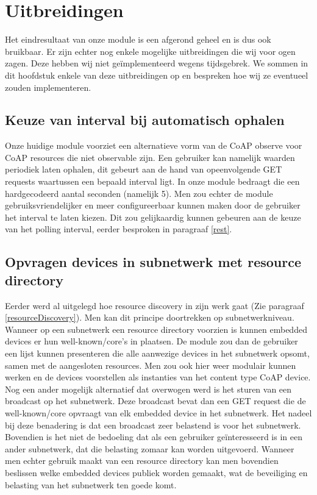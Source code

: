 \chapter{Uitbreidingen} \label{uitbreidingen}

Het eindresultaat van onze module is een afgerond geheel en is dus ook bruikbaar. Er zijn echter nog enkele mogelijke uitbreidingen die wij voor ogen zagen. Deze hebben wij niet ge\"{i}mplementeerd wegens tijdsgebrek. We sommen in dit hoofdstuk enkele van deze uitbreidingen op en bespreken hoe wij ze eventueel zouden implementeren.

\section{Keuze van interval bij automatisch ophalen}
Onze huidige module voorziet een alternatieve vorm van de CoAP observe voor CoAP resources die niet observable zijn. Een gebruiker kan namelijk waarden periodiek laten ophalen, dit gebeurt
aan de hand van opeenvolgende GET requests waartussen een bepaald interval ligt. In onze module bedraagt die een hardgecodeerd aantal seconden (namelijk 5). Men zou echter de module
gebruiksvriendelijker en meer configureerbaar kunnen maken door de gebruiker het interval te laten kiezen. Dit zou gelijkaardig kunnen gebeuren aan de keuze van het polling interval, eerder
besproken in paragraaf \ref{rest}.

\section{Opvragen devices in subnetwerk met resource directory} \label{resourceDirectory}
Eerder werd al uitgelegd hoe resource discovery in zijn werk gaat (Zie paragraaf \ref{resourceDiscovery}). Men kan dit principe doortrekken op subnetwerkniveau. Wanneer op een subnetwerk een resource directory voorzien is
kunnen embedded devices er hun well-known/core's in plaatsen. De module zou dan de gebruiker een lijst kunnen presenteren die alle aanwezige devices in het subnetwerk opsomt, samen
met de aangesloten resources. Men zou ook hier weer modulair kunnen werken en de devices voorstellen als instanties van het content type CoAP device.\\

Nog een ander mogelijk alternatief dat overwogen werd is het sturen van een broadcast op het subnetwerk. Deze broadcast bevat dan een GET request die de well-known/core opvraagt
van elk embedded device in het subnetwerk. Het nadeel bij deze benadering is dat een broadcast zeer belastend is voor het subnetwerk. Bovendien is het niet de bedoeling dat als een gebruiker
ge\"{i}nteresseerd is in een ander subnetwerk, dat die belasting zomaar kan worden uitgevoerd. Wanneer men echter gebruik maakt van een resource directory kan men bovendien beslissen welke
embedded devices publiek worden gemaakt, wat de beveiliging en belasting van het subnetwerk ten goede komt.

